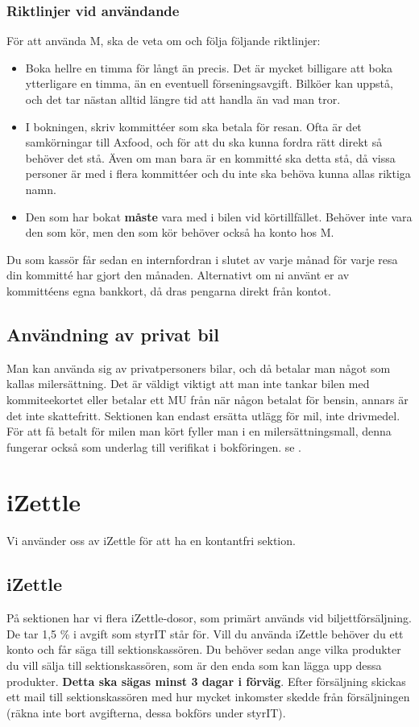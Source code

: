 \documentclass{article}
\begin{document}
\subsubsection{Riktlinjer vid användande}
För att använda M, ska de veta om och följa följande riktlinjer:
\begin{itemize}
    \item Boka hellre en timma för långt än precis. Det är mycket billigare att boka ytterligare en timma, än en eventuell förseningsavgift. Bilköer kan uppstå, och det tar nästan alltid längre tid att handla än vad man tror. 
    \item I bokningen, skriv kommittéer som ska betala för resan. Ofta är det samkörningar till Axfood, och för att du ska kunna fordra rätt direkt så behöver det stå. Även om man bara är en kommitté ska detta stå, då vissa personer är med i flera kommittéer och du inte ska behöva kunna allas riktiga namn. 
    \item Den som har bokat \textbf{måste} vara med i bilen vid körtillfället. Behöver inte vara den som kör, men den som kör behöver också ha konto hos M. 
\end{itemize}
Du som kassör får sedan en internfordran i slutet av varje månad för varje resa din kommitté har gjort den månaden. Alternativt om ni använt er av kommittéens egna bankkort, då dras pengarna direkt från kontot.

\subsection{Användning av privat bil}
Man kan använda sig av privatpersoners bilar, och då betalar man något som kallas milersättning. Det är väldigt viktigt att man inte tankar bilen med kommiteekortet eller betalar ett MU från när någon betalat för bensin, annars är det inte skattefritt. Sektionen kan endast ersätta utlägg för mil, inte drivmedel. 
För att få betalt för milen man kört fyller man i en milersättningsmall, denna fungerar också som underlag till verifikat i bokföringen. se .


\section{iZettle}
\label{sec:izettle-swish}
Vi använder oss av iZettle för att ha en kontantfri sektion. 
\subsection{iZettle}
På sektionen har vi flera iZettle-dosor, som primärt används vid biljettförsäljning. De tar 1,5 \% i avgift som styrIT står för. Vill du använda iZettle behöver du ett konto och får säga till sektionskassören. Du behöver sedan ange vilka produkter du vill sälja till sektionskassören, som är den enda som kan lägga upp dessa produkter. \textbf{Detta ska sägas minst 3 dagar i förväg}. Efter försäljning skickas ett mail till sektionskassören med hur mycket inkomster skedde från försäljningen (räkna inte bort avgifterna, dessa bokförs under styrIT).
\end{document}
